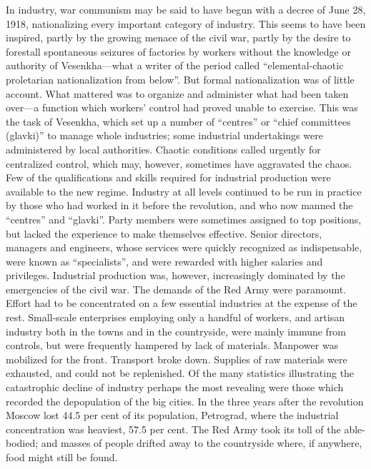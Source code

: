 In industry, war communism may be said to have begun with a decree of June 28, 1918, nationalizing every important category of industry. This seems to have been inspired, partly by the growing menace of the civil war, partly by the desire to forestall spontaneous seizures of factories by workers without the knowledge or authority of Vesenkha---what a writer of the period called ``elemental-chaotic proletarian nationalization from below''. But formal nationalization was of little account. What mattered was to organize and administer what had been taken over---a function which workers' control had proved unable to exercise. This was the task of Vesenkha, which set up a number of ``centres'' or ``chief committees (glavki)'' to manage whole industries; some industrial undertakings were administered by local authorities. Chaotic conditions called urgently for centralized control, which may, however, sometimes have aggravated the chaos. Few of the qualifications and skills required for industrial production were available to the new regime. Industry at all levels continued to be run in practice by those who had worked in it before the revolution, and who now manned the ``centres'' and ``glavki''. Party members were sometimes assigned to top positions, but lacked the experience to make themselves effective. Senior directors, managers and engineers, whose services were quickly recognized as indispensable, were known as ``specialists'', and were rewarded with higher salaries and privileges. Industrial production was, however, increasingly dominated by the emergencies of the civil war. The demands of the Red Army were paramount. Effort had to be concentrated on a few essential industries at the expense of the rest. Small-scale enterprises employing only a handful of workers, and artisan industry both in the towns and in the countryside, were mainly immune from controls, but were frequently hampered by lack of materials. Manpower was mobilized for the front. Transport broke down. Supplies of raw materials were exhausted, and could not be replenished. Of the many statistics illustrating the catastrophic decline of industry perhaps the most revealing were those which recorded the depopulation of the big cities. In the three years after the revolution Moscow lost 44.5 per cent of its population, Petrograd, where the industrial concentration was heaviest, 57.5 per cent. The Red Army took its toll of the able-bodied; and masses of people drifted away to the countryside where, if anywhere, food might still be found. 

